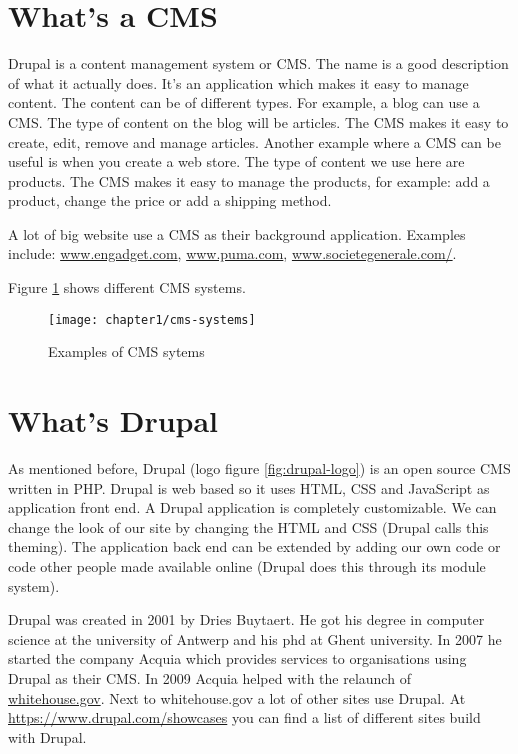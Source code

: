 \section{What's a CMS}
 
 Drupal is a content management system or CMS. The name is a good description of what it actually does. It's an application which makes it easy to manage content. The content can be of different types. For example, a blog can use a CMS. The type of content on the blog will be articles. The CMS makes it easy to create, edit, remove and manage articles. Another example where a CMS can be useful is when you create a web store. The type of content we use here are products. The CMS makes it easy to manage the products, for example: add a product, change the price or add a shipping method.
 
 A lot of big website use a CMS as their background application. Examples include: \url{www.engadget.com},  \url{www.puma.com}, \url{www.societegenerale.com/}.
 
 Figure \ref{fig:cms-sytems} shows different CMS systems.
 
 \begin{figure}[H]
 	\centering
 	\texttt{[image: chapter1/cms-systems]}
 	\caption{Examples of CMS sytems}
 	\label{fig:cms-sytems}
 \end{figure}
 
 \section{What's Drupal}
As mentioned before, Drupal (logo figure \ref{fig:drupal-logo}) is an open source CMS written in PHP. Drupal is web based so it uses HTML, CSS and JavaScript as application front end. A Drupal application is completely customizable. We can change the look of our site by changing the HTML and CSS (Drupal calls this theming). The application back end can be extended by adding our own code or code other people made available online (Drupal does this through its module system). 

Drupal was created in 2001 by Dries Buytaert. He got his degree in computer science at the university of Antwerp and his phd at Ghent university. In 2007 he started the company Acquia which provides services to organisations using Drupal as their CMS. In 2009 Acquia helped with the relaunch of  \url{whitehouse.gov}. Next to whitehouse.gov a lot of other sites use Drupal. At \url{https://www.drupal.com/showcases} you can find a list of different sites build with Drupal.

